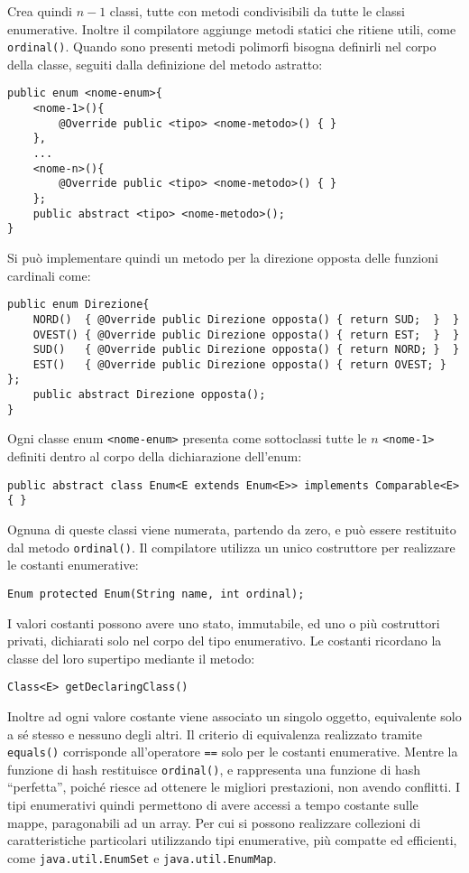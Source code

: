 \documentclass{article}
\numberwithin{equation}{subsection}
\begin{document}
Crea quindi $n-1$ classi, tutte con metodi condivisibili da tutte le classi enumerative. Inoltre il compilatore aggiunge metodi statici che ritiene utili, come \verb|ordinal()|. 
Quando sono presenti metodi polimorfi bisogna definirli nel corpo della classe, seguiti dalla definizione del metodo astratto:
\begin{verbatim}
public enum <nome-enum>{
    <nome-1>(){
        @Override public <tipo> <nome-metodo>() { }
    },
    ...
    <nome-n>(){
        @Override public <tipo> <nome-metodo>() { }
    };
    public abstract <tipo> <nome-metodo>();
}
\end{verbatim}
Si può implementare quindi un metodo per la direzione opposta delle funzioni cardinali come:
\begin{verbatim}
public enum Direzione{
    NORD()  { @Override public Direzione opposta() { return SUD;  }  }
    OVEST() { @Override public Direzione opposta() { return EST;  }  }
    SUD()   { @Override public Direzione opposta() { return NORD; }  }
    EST()   { @Override public Direzione opposta() { return OVEST; } };
    public abstract Direzione opposta();
}
\end{verbatim}

Ogni classe enum \verb|<nome-enum>| presenta come sottoclassi tutte le $n$ \verb|<nome-1>| definiti dentro al corpo della dichiarazione dell'enum: 
\begin{verbatim}
public abstract class Enum<E extends Enum<E>> implements Comparable<E> { }
\end{verbatim}

Ognuna di queste classi viene numerata, partendo da zero, e può essere restituito dal metodo \verb|ordinal()|. Il compilatore utilizza un unico costruttore per realizzare le costanti enumerative:
\begin{verbatim}
Enum protected Enum(String name, int ordinal);
\end{verbatim}

I valori costanti possono avere uno stato, immutabile, ed uno o più costruttori privati, dichiarati solo nel corpo del tipo enumerativo. 
Le costanti ricordano la classe del loro supertipo mediante il metodo:
\begin{verbatim}
Class<E> getDeclaringClass()
\end{verbatim}

Inoltre ad ogni valore costante viene associato un singolo oggetto, equivalente solo a sé stesso e nessuno degli altri. Il criterio di equivalenza realizzato tramite \verb|equals()| corrisponde all'operatore 
\verb|==| solo per le costanti enumerative. Mentre la funzione di hash restituisce \verb|ordinal()|, e rappresenta una funzione di hash ``perfetta'', poiché riesce ad ottenere le migliori prestazioni, non 
avendo conflitti. I tipi enumerativi quindi permettono di avere accessi a tempo costante sulle mappe, paragonabili ad un array. 
Per cui si possono realizzare collezioni di caratteristiche particolari utilizzando tipi enumerative, più compatte ed efficienti, come \verb|java.util.EnumSet| e \verb|java.util.EnumMap|. 
\end{document}

